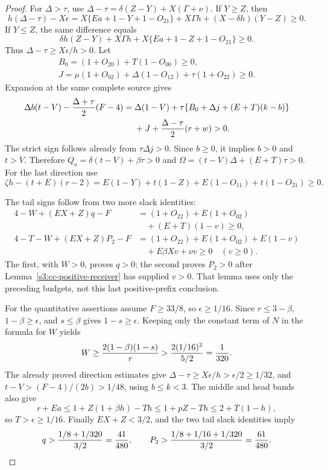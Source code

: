 \documentclass[11pt,reqno]{amsart}
\theoremstyle{definition}
\theoremstyle{remark}
\begin{document}
\begin{proof}
For \(\Delta>\tau\), use
\(\Delta-\tau=\delta(Z-Y)+X(\Gamma+\nu)\).
If \(Y\ge Z\), then
\[
 h(\Delta-\tau)-X\epsilon
 =X\{Ea+1-Y+1-O_{21}\}+X\Gamma h
                         +(X-\delta h)(Y-Z)\ge0.
\]
If \(Y\le Z\), the same difference equals
\[
 \delta h(Z-Y)+X\Gamma h+X\{Ea+1-Z+1-O_{21}\}\ge0.
\]
Thus \(\Delta-\tau\ge X\epsilon/h>0\).
Let
\[
 \begin{gathered} B_0=(1+O_{20})+T(1-O_{00})\ge0,\\
 J=\mu(1+O_{02})+\Delta(1-O_{12})+\tau(1+O_{22})\ge0.\end{gathered}
\]
Expansion at the same complete source gives
\begin{align*}
 \Delta b(t-V)-{\Delta+\tau\over2}(F-4)
 ={}&\Delta(1-V)+\tau\{B_0+\Delta j+(E+T)(k-b)\}\\
 &+J+{\Delta-\tau\over2}(r+w)>0.
\end{align*}
The strict sign follows already from \(\tau\Delta j>0\).
Since \(b\ge0\), it implies \(b>0\) and \(t>V\).
Therefore
\(Q_o=\delta(t-V)+\beta\tau>0\) and
\(\Omega=(t-V)\Delta+(E+T)\tau>0\).
For the last direction use
\[
 \zeta h-(t+E)(r-2)
 =E(1-Y)+t(1-Z)+E(1-O_{11})+t(1-O_{21})\ge0.
\]

The tail signs follow from two more slack identities:
\begin{align*}
 4-W+(EX+Z)q-F
   &=(1+O_{22})+E(1+O_{02})\\
   &\quad +(E+T)(1-v)\ge0,\\
 4-T-W+(EX+Z)P_2-F
   &=(1+O_{22})+E(1+O_{02})+E(1-v)\\
   &\quad +E\beta Xv+\nu v\ge0\quad(v\ge0).
\end{align*}
The first, with \(W>0\), proves \(q>0\); the second proves
\(P_2>0\) after Lemma~\ref{s3:cc-positive-receiver} has supplied
\(v>0\). That lemma uses only the preceding budgets, not this last
positive-prefix conclusion.

For the quantitative assertions assume \(F\ge33/8\), so
\(\epsilon\ge1/16\). Since \(r\le3-\beta\),
\(1-\beta\ge\epsilon\), and \(s\le\beta\) gives
\(1-s\ge\epsilon\). Keeping only the constant term of \(N\)
in the formula for \(W\) yields
\[
 W\ge {2(1-\beta)(1-s)\over r}
   >{2(1/16)^2\over5/2}=\frac1{320}.
\]
The already proved direction estimates give
\(\Delta-\tau\ge X\epsilon/h>\epsilon/2\ge1/32\), and
\(t-V>(F-4)/(2b)>1/48\), using \(b\le k<3\).
The middle and head bands also give
\[
 r+Ea\le1+Z(1+\beta h)-Th\le1+pZ-Th
 \le2+T(1-h),
\]
so \(T>\epsilon\ge1/16\).
Finally \(EX+Z<3/2\), and the two tail slack identities imply
\[
 q>{1/8+1/320\over3/2}=\frac{41}{480},\qquad
 P_2>{1/8+1/16+1/320\over3/2}=\frac{61}{480}.
\]
\end{proof}
\end{document}
